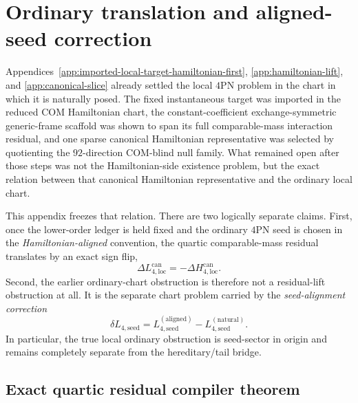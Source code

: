 \documentclass[11pt]{article}
\begin{document}

\section{Ordinary translation and aligned-seed correction}
\label{app:ordinary-translation-aligned-seed}

Appendices~\ref{app:imported-local-target-hamiltonian-first},
\ref{app:hamiltonian-lift}, and \ref{app:canonical-slice} already settled the
local $4$PN problem in the chart in which it is naturally posed.  The fixed
instantaneous target was imported in the reduced COM Hamiltonian chart, the
constant-coefficient exchange-symmetric generic-frame scaffold was shown to span
its full comparable-mass interaction residual, and one sparse canonical
Hamiltonian representative was selected by quotienting the $92$-direction
COM-blind null family.  What remained open after those steps was not the
Hamiltonian-side existence problem, but the exact relation between that
canonical Hamiltonian representative and the ordinary local chart.

This appendix freezes that relation.  There are two logically separate claims.
First, once the lower-order ledger is held fixed and the ordinary $4$PN seed is
chosen in the \emph{Hamiltonian-aligned} convention, the quartic comparable-mass
residual translates by an exact sign flip,
\begin{equation}
\boxed{
\Delta L_{4,\mathrm{loc}}^{\mathrm{can}}
=
-\Delta H_{4,\mathrm{loc}}^{\mathrm{can}}.
}
\label{eq:app-ordinary-translation-sign-flip-preview}
\end{equation}
Second, the earlier ordinary-chart obstruction is therefore not a residual-lift
obstruction at all.  It is the separate chart problem carried by the
\emph{seed-alignment correction}
\begin{equation}
\delta L_{4,\mathrm{seed}}
=
L_{4,\mathrm{seed}}^{(\mathrm{aligned})}
-
L_{4,\mathrm{seed}}^{(\mathrm{natural})}.
\label{eq:app-ordinary-translation-delta-seed-preview}
\end{equation}
In particular, the true local ordinary obstruction is seed-sector in origin and
remains completely separate from the hereditary/tail bridge.

\subsection{Exact quartic residual compiler theorem}
\label{app:ordinary-translation-residual-compiler}
\end{document}
